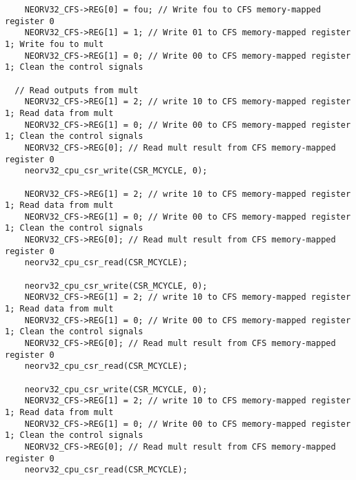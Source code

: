 \begin{code}
\begin{verbatim}
    NEORV32_CFS->REG[0] = fou; // Write fou to CFS memory-mapped register 0
    NEORV32_CFS->REG[1] = 1; // Write 01 to CFS memory-mapped register 1; Write fou to mult
    NEORV32_CFS->REG[1] = 0; // Write 00 to CFS memory-mapped register 1; Clean the control signals

  // Read outputs from mult
    NEORV32_CFS->REG[1] = 2; // write 10 to CFS memory-mapped register 1; Read data from mult
    NEORV32_CFS->REG[1] = 0; // Write 00 to CFS memory-mapped register 1; Clean the control signals
    NEORV32_CFS->REG[0]; // Read mult result from CFS memory-mapped register 0  
    neorv32_cpu_csr_write(CSR_MCYCLE, 0);

    NEORV32_CFS->REG[1] = 2; // write 10 to CFS memory-mapped register 1; Read data from mult
    NEORV32_CFS->REG[1] = 0; // Write 00 to CFS memory-mapped register 1; Clean the control signals
    NEORV32_CFS->REG[0]; // Read mult result from CFS memory-mapped register 0  
    neorv32_cpu_csr_read(CSR_MCYCLE); 

    neorv32_cpu_csr_write(CSR_MCYCLE, 0);
    NEORV32_CFS->REG[1] = 2; // write 10 to CFS memory-mapped register 1; Read data from mult
    NEORV32_CFS->REG[1] = 0; // Write 00 to CFS memory-mapped register 1; Clean the control signals
    NEORV32_CFS->REG[0]; // Read mult result from CFS memory-mapped register 0  
    neorv32_cpu_csr_read(CSR_MCYCLE); 

    neorv32_cpu_csr_write(CSR_MCYCLE, 0);
    NEORV32_CFS->REG[1] = 2; // write 10 to CFS memory-mapped register 1; Read data from mult
    NEORV32_CFS->REG[1] = 0; // Write 00 to CFS memory-mapped register 1; Clean the control signals
    NEORV32_CFS->REG[0]; // Read mult result from CFS memory-mapped register 0  
    neorv32_cpu_csr_read(CSR_MCYCLE); 


\end{verbatim}
\end{code}
